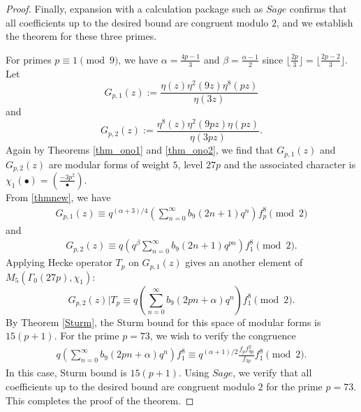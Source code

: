 \documentclass[reqno]{amsart}
\theoremstyle{definition}
\theoremstyle{remark}
\numberwithin{equation}{section}
\begin{document}
\begin{proof}
Finally, expansion with a calculation package such as $Sage$ confirms that all coefficients up to the desired bound are congruent modulo $2$, and we establish the theorem for these three primes.
\par For primes $p\equiv1 \pmod9$, we have $\alpha=\frac{4p-1}{3}$ and $\beta=\frac{\alpha-1}{2}$ since $\lfloor \frac{2p}{3}\rfloor=\lfloor \frac{2p-2}{3}\rfloor$.
Let
$$
G_{p,1}(z):=\frac{\eta(z)\eta^2(9z)\eta^8(pz)}{\eta(3z)}
$$
and
$$
G_{p,2}(z):=\frac{\eta^8(z)\eta^2(9pz)\eta(pz)}{\eta(3pz)}.
$$
Again by Theorems \ref{thm_ono1} and \ref{thm_ono2}, we find that $G_{p,1}(z)$ and $G_{p,2}(z)$ are modular forms of weight $5$, level $27p$ and the associated character is $\chi_1(\bullet)=(\frac{-3p^2}{\bullet})$. \\
From \eqref{thmnew}, we have
\begin{align*}
G_{p,1}(z)\equiv q^{(\alpha+3)/4}\left(\sum_{n=0}^{\infty}b_9(2n+1)q^{n}\right) f^{8}_{p}\pmod{2}
\end{align*}
and
\begin{align*}
G_{p,2}(z)\equiv q\left(q^{\beta}\sum_{n=0}^{\infty}b_9(2n+1)q^{pn} \right) f^{8}_{1}\pmod{2}.
\end{align*}
 Applying Hecke operator $T_p$ on $G_{p,1}(z)$ gives an another element of $M_5\left(\Gamma_0(27p),\chi_1\right)$:
$$
G_{p,2}(z)|T_p\equiv q\left(\sum_{n=0}^{\infty}b_9(2pn+\alpha)q^{n} \right)f^{8}_1\pmod{2}.
$$
By Theorem \ref{Sturm}, the Sturm bound for this space of modular forms is $15(p+1)$. For the prime $p=73$, we wish to verify the congruence
\begin{align*}
q\left(\sum_{n=0}^{\infty}b_9(2pn+\alpha)q^{n} \right)f^{8}_1\equiv q^{(\alpha+1)/2}\frac{f_pf^{2}_{9p}}{f_{3p}}f^{8}_{1}\pmod 2.
\end{align*}
In this case, Sturm bound is $15(p+1)$. Using $Sage$, we verify that all coefficients up to the desired bound are congruent modulo $2$ for the prime $p=73$. This completes the proof of the theorem.
\end{proof}
\end{document}
